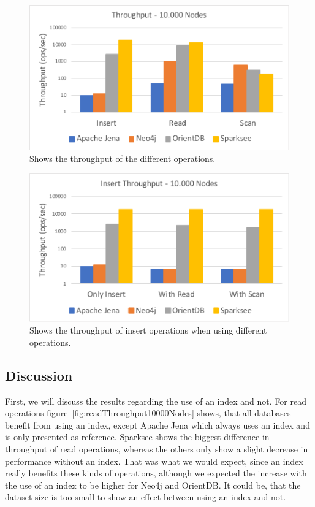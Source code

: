 \begin{figure}[h!]
  \centering
  \includegraphics[width=.75\textwidth]{images/responsiveness/operationReadScan}
  \caption{Shows the throughput of the different operations.}
  \label{fig:operationReadScan}
\end{figure}

\begin{figure}[h!]
  \centering
  \includegraphics[width=.75\textwidth]{images/responsiveness/insertWithWithoutReadScan}
  \caption{Shows the throughput of insert operations when using different operations.}
  \label{fig:insertWithWithoutReadScan}
\end{figure}

\subsection{Discussion}
First,
we will discuss the results regarding the use of an index and not.
For read operations figure~\ref{fig:readThroughput10000Nodes} shows,
that all databases benefit from using an index,
except Apache Jena which always uses an index and is only presented as reference.
Sparksee shows the biggest difference in throughput of read operations,
whereas the others only show a slight decrease in performance without an index.
That was what we would expect,
since an index really benefits these kinds of operations,
although we expected the increase with the use of an index to be higher for Neo4j and OrientDB.
It could be,
that the dataset size is too small to show an effect between using an index and not.

